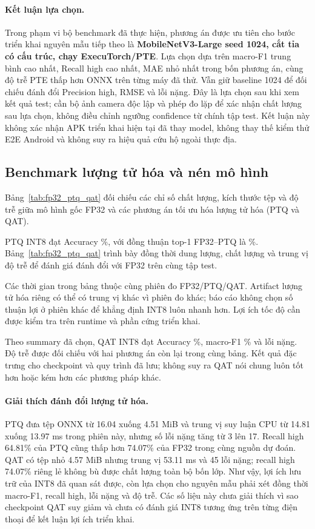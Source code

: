 \paragraph{Kết luận lựa chọn.}
Trong phạm vi bộ benchmark đã thực hiện, phương án được ưu tiên cho bước triển khai nguyên mẫu tiếp theo là \textbf{MobileNetV3-Large seed 1024, cắt tỉa có cấu trúc, chạy ExecuTorch/PTE}. Lựa chọn dựa trên macro-F1 trung bình cao nhất, Recall high cao nhất, MAE nhỏ nhất trong bốn phương án, cùng độ trễ PTE thấp hơn ONNX trên từng máy đã thử. Vẫn giữ baseline 1024 để đối chiếu đánh đổi Precision high, RMSE và lỗi nặng. Đây là lựa chọn sau khi xem kết quả test; cần bộ ảnh camera độc lập và phép đo lặp để xác nhận chất lượng sau lựa chọn, không điều chỉnh ngưỡng confidence từ chính tập test. Kết luận này không xác nhận APK triển khai hiện tại đã thay model, không thay thế kiểm thử E2E Android và không suy ra hiệu quả cứu hộ ngoài thực địa.

\subsection{Benchmark lượng tử hóa và nén mô hình}
Bảng~\ref{tab:fp32_ptq_qat} đối chiếu các chỉ số chất lượng, kích thước tệp và độ trễ giữa mô hình gốc FP32 và các phương án tối ưu hóa lượng tử hóa (PTQ và QAT).



PTQ INT8 đạt Accuracy \PTQAccuracy\%, với đồng thuận top-1 FP32--PTQ là \PTQAgreement\%. Bảng~\ref{tab:fp32_ptq_qat} trình bày đồng thời dung lượng, chất lượng và trung vị độ trễ để đánh giá đánh đổi với FP32 trên cùng tập test.

Các thời gian trong bảng thuộc cùng phiên đo FP32/PTQ/QAT. Artifact lượng tử hóa riêng có thể có trung vị khác vì phiên đo khác; báo cáo không chọn số thuận lợi ở phiên khác để khẳng định INT8 luôn nhanh hơn. Lợi ích tốc độ cần được kiểm tra trên runtime và phần cứng triển khai.

Theo summary đã chọn, QAT INT8 đạt Accuracy \QATAccuracy\%, macro-F1 \QATMacroFOne\% và \QATCriticalCount{} lỗi nặng. Độ trễ được đối chiếu với hai phương án còn lại trong cùng bảng. Kết quả đặc trưng cho checkpoint và quy trình đã lưu; không suy ra QAT nói chung luôn tốt hơn hoặc kém hơn các phương pháp khác.

\paragraph{Giải thích đánh đổi lượng tử hóa.} PTQ đưa tệp ONNX từ 16.04 xuống 4.51 MiB và trung vị suy luận CPU từ 14.81 xuống 13.97 ms trong phiên này, nhưng số lỗi nặng tăng từ 3 lên 17. Recall high 64.81\% của PTQ cũng thấp hơn 74.07\% của FP32 trong cùng nguồn dự đoán. QAT có tệp nhỏ 4.57 MiB nhưng trung vị 53.11 ms và 45 lỗi nặng; recall high 74.07\% riêng lẻ không bù được chất lượng toàn bộ bốn lớp. Như vậy, lợi ích lưu trữ của INT8 đã quan sát được, còn lựa chọn cho nguyên mẫu phải xét đồng thời macro-F1, recall high, lỗi nặng và độ trễ. Các số liệu này chưa giải thích vì sao checkpoint QAT suy giảm và chưa có đánh giá INT8 tương ứng trên từng điện thoại để kết luận lợi ích triển khai.

